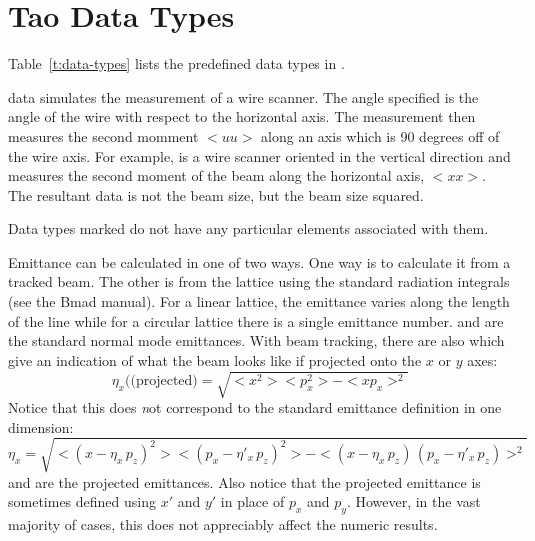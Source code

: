 \section{Tao Data Types}
\label{s:data-types}

Table~\ref{t:data-types} lists the predefined data types in \tao.

 data simulates the measurement of a wire scanner. The angle specified
is the angle of the wire with respect to the horizontal axis. The measurement
then measures the second momment $<uu>$ along an axis which is 90 degrees off of
the wire axis. For example,  is a wire scanner oriented in the
vertical direction and measures the second moment of the beam along the
horizontal axis, $<xx>$. The resultant data is not the beam size, but the beam
size squared.

Data types marked  do not have any particular elements
associated with them.

Emittance can be calculated in one of two ways. One way is to
calculate it from a tracked beam. The other is from the lattice using
the standard radiation integrals (see the Bmad manual). For a linear
lattice, the emittance varies along the length of the line while for a
circular lattice there is a single emittance number. 
and  are the standard normal mode emittances. With
beam tracking, there are also  which give an
indication of what the beam looks like if projected onto the $x$ or
$y$ axes:
\begin{equation}
  \eta_x (\mbox{(projected)} = \sqrt{<x^2> <p_x^2> - <x p_x>^2}
\end{equation}
Notice that this does {\emph not} correspond to the standard emittance
definition in one dimension:
\begin{equation}
  \eta_x = \sqrt{<(x - \eta_x \, p_z)^2> <(p_x - \eta'_x \, p_z)^2> - 
  <(x - \eta_x \, p_z) \, (p_x - \eta'_x \, p_z)>^2}
\end{equation}
 and  are the projected emittances.
Also notice that the projected emittance is sometimes defined using
$x'$ and $y'$ in place of $p_x$ and $p_y$. However, in the vast
majority of cases, this does not appreciably affect the numeric
results.

